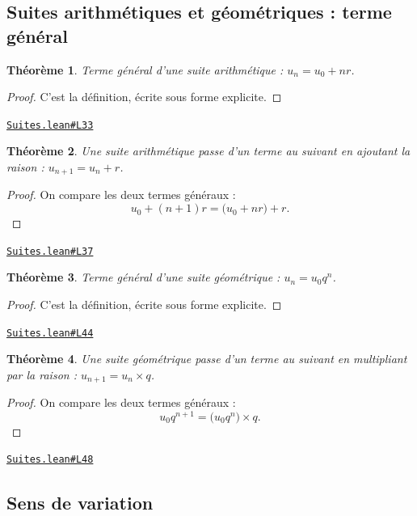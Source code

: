 \documentclass[11pt,a4paper]{article}
\theoremstyle{definition}
\theoremstyle{plain}
\newtheorem{theoreme}{Théorème}
\newcommand{\source}[2]{\par\smallskip\noindent\hfill{\footnotesize\href{#1}{\texttt{#2}}}\par\smallskip}
\begin{document}
\subsection{Suites arithmétiques et géométriques : terme général}

\begin{theoreme}
Terme général d'une suite arithmétique : $u_n = u_0 + nr$.
\end{theoreme}

\begin{proof}
C'est la définition, écrite sous forme explicite.
\end{proof}
\source{https://github.com/Commutator-IO/learn-lean/blob/main/cours/02-lycee/03-suites/Suites.lean\#L33}{Suites.lean\#L33}

\begin{theoreme}
Une suite arithmétique passe d'un terme au suivant en ajoutant la raison :
$u_{n+1} = u_n + r$.
\end{theoreme}

\begin{proof}
On compare les deux termes généraux :
\[ u_0 + (n+1)r = \bigl(u_0 + nr\bigr) + r . \]
\end{proof}
\source{https://github.com/Commutator-IO/learn-lean/blob/main/cours/02-lycee/03-suites/Suites.lean\#L37}{Suites.lean\#L37}

\begin{theoreme}
Terme général d'une suite géométrique : $u_n = u_0 q^n$.
\end{theoreme}

\begin{proof}
C'est la définition, écrite sous forme explicite.
\end{proof}
\source{https://github.com/Commutator-IO/learn-lean/blob/main/cours/02-lycee/03-suites/Suites.lean\#L44}{Suites.lean\#L44}

\begin{theoreme}
Une suite géométrique passe d'un terme au suivant en multipliant par la raison :
$u_{n+1} = u_n \times q$.
\end{theoreme}

\begin{proof}
On compare les deux termes généraux :
\[ u_0 q^{n+1} = \bigl(u_0 q^n\bigr) \times q . \]
\end{proof}
\source{https://github.com/Commutator-IO/learn-lean/blob/main/cours/02-lycee/03-suites/Suites.lean\#L48}{Suites.lean\#L48}

\subsection{Sens de variation}
\end{document}
